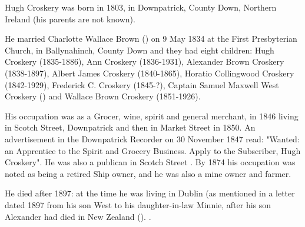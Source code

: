 
Hugh Croskery was born in 1803, in Downpatrick, County Down, Northern Ireland (his parents are not known).

He married Charlotte Wallace Brown () on 9 May 1834 at the First Presbyterian Church, in Ballynahinch, County Down and they had eight children:  Hugh Croskery (1835-1886), Ann Croskery (1836-1931), Alexander Brown Croskery (1838-1897), Albert James Croskery (1840-1865), Horatio Collingwood Croskery (1842-1929), Frederick C. Croskery (1845-?),  Captain Samuel Maxwell West Croskery () and Wallace Brown Croskery (1851-1926). 

His occupation was as a Grocer, wine, spirit and general merchant, in 1846 living in Scotch Street, Downpatrick and then in Market Street in 1850. An advertisement in the Downpatrick Recorder on 30 November 1847 read:
"Wanted: an Apprentice to the Spirit and Grocery Business. Apply to the Subscriber, Hugh Croskery". \cite{HCroskeryAdvert}  He was also a publican in Scotch Street \cite{HughCroskeryOccupation}. By 1874 his occupation was noted as being a retired Ship owner, and he was also a mine owner and farmer. 

He died after 1897: at the time he was living in Dublin (as mentioned in a letter dated 1897 from his son West to his daughter-in-law Minnie, after his son Alexander had died in New Zealand (). \cite{HughCroskeryDeath}.

